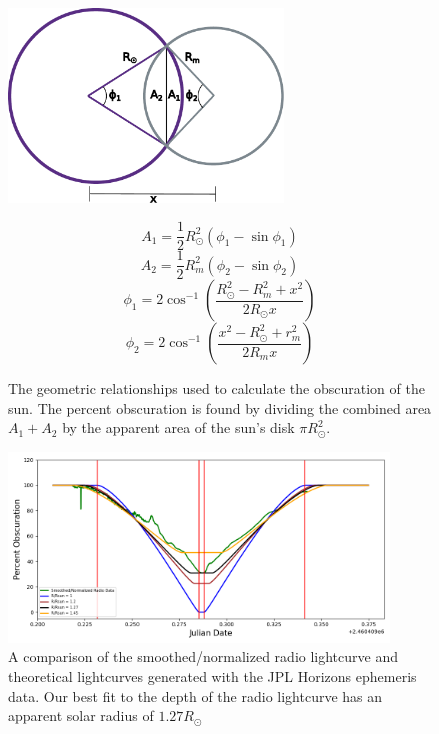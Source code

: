 \begin{figure}
\begin{minipage}{0.49\textwidth}
  \includegraphics[width=0.65\textwidth]{figures/drawing_updated}
  \caption{\label{fig:eclipse_geometry} The geometric relationships used to calculate the obscuration of the sun. The percent obscuration is found by dividing the combined area $A_1 + A_2$ by the apparent area of the sun's disk $\pi R_\odot^2$.}
\end{minipage}
\hfill
\begin{minipage}{0.49\textwidth}
\begin{equation}\label{eq:geometry_1}
  A_1 = \frac{1}{2}R_{\odot}^2\left(\phi_1 - \sin\phi_1\right)
\end{equation}
\begin{equation}\label{eq:geometry_2}
  A_2 = \frac{1}{2}R_{m}^2\left(\phi_2 - \sin\phi_2\right)
\end{equation}
\begin{equation}\label{eq:geometry_3}
  \phi_1 = 2\cos^{-1}\left(\frac{R_{\odot}^2 - R_{m}^2+x^2}{2R_{\odot}x}\right)
\end{equation}
\begin{equation}\label{eq:geometry_4}
  \phi_2 = 2\cos^{-1}\left(\frac{x^2 - R_{\odot}^2 + r_{m}^2}{2R_{m}x}\right)
\end{equation}
\end{minipage}
\end{figure}



\begin{figure}
  \includegraphics[width=0.9\textwidth]{figures/RadiovsTheoretical}
  \caption{\label{fig:RadiovsTheoretical} A comparison of the smoothed/normalized radio lightcurve and theoretical lightcurves generated with the JPL Horizons ephemeris data. Our best fit to the depth of the radio lightcurve has an apparent solar radius of $1.27 R_{\odot}$}
\end{figure}

